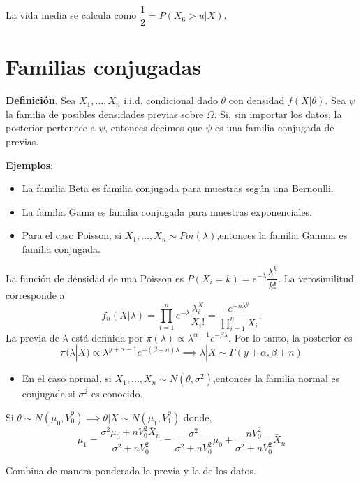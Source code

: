 \documentclass[
  12pt,
]{book}
\providecommand{\tightlist}{%
  \setlength{\itemsep}{0pt}\setlength{\parskip}{0pt}}
\begin{document}
La vida media se calcula como \(\dfrac{1}{2} = P(X_6>u|X)\).

\hypertarget{familias-conjugadas}{%
\section{Familias conjugadas}\label{familias-conjugadas}}

\textbf{Definición}. Sea \(X_1,\dots, X_n\) i.i.d. condicional dado \(\theta\) con
densidad \(f(X|\theta)\). Sea \(\psi\) la familia de posibles densidades previas
sobre \(\Omega\). Si, sin importar los datos, la posterior pertenece a \(\psi\),
entonces decimos que \(\psi\) es una familia conjugada de previas.

\textbf{Ejemplos}:

\begin{itemize}
\item
  La familia Beta es familia conjugada para muestras según una Bernoulli.
\item
  La familia Gama es familia conjugada para muestras exponenciales.
\item
  Para el caso Poisson, si \(X_1,\dots,X_n\sim Poi(\lambda)\),entonces la familia
  Gamma es familia conjugada.
\end{itemize}

La función de densidad de una Poisson es \(P(X_i = k) = e^{-\lambda}\dfrac{\lambda^k}{k!}\). La verosimilitud corresponde a
\[ f_n(X|\lambda) = \prod_{i=1}^{n}e^{-\lambda}\dfrac{\lambda^X_i}{X_i!} = \dfrac{e^{-n\lambda^y}}{\prod_{i=1}^n X_i}.\]
La previa de \(\lambda\) está definida por \(\pi(\lambda)\propto\lambda^{\alpha-1}e^{-\beta\lambda}\). Por lo tanto, la posterior es
\[ \pi(\lambda|X) \propto \lambda^{y+\alpha-1}e^{-(\beta+n)\lambda} \implies
 \lambda|X \sim \Gamma(y+\alpha,\beta+n)\]

\begin{itemize}
\tightlist
\item
  En el caso normal, si \(X_1,\dots,X_n\sim N(\theta,\sigma^2)\),entonces la familia normal es conjugada si \(\sigma^2\) es conocido.
\end{itemize}

Si \(\theta \sim N(\mu_0,V_0^2) \implies \theta|X \sim N(\mu_1, V_1^2)\) donde,
\[\mu_1 = \dfrac{\sigma^2\mu_0 + nV_0^2 \bar X_n}{\sigma^2 + nV_0^2}  = \dfrac{\sigma^2}{\sigma^2 + nV_0^2}\mu_0 + \dfrac{nV_0^2}{\sigma^2 + nV_0^2}\bar X_n\]

Combina de manera ponderada la previa y la de los datos.
\end{document}
